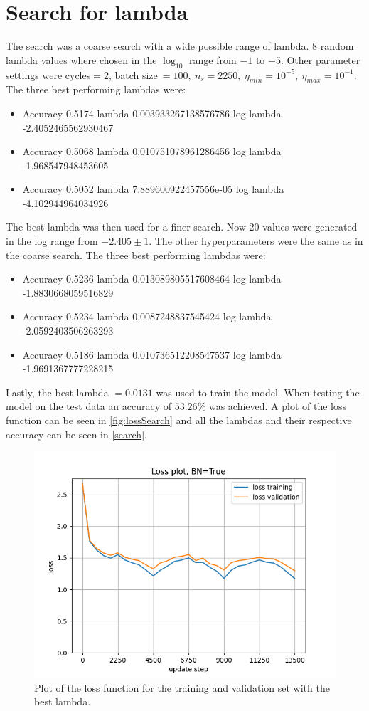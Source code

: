 \documentclass[12pt, a4paper]{article}
\begin{document}
\section{Search for lambda}
The search was a coarse search with a wide possible range of lambda. 8 random lambda values where chosen in the $\log_{10}$ range from $-1$ to $-5$. Other parameter settings were cycles$=2$, batch size$\ =100,\ n_s=2250,\ \eta_{min}=10^{-5},\ \eta_{max}=10^{-1}$. The three best performing lambdas were:
\begin{itemize}
    \item Accuracy 0.5174 lambda 0.003933267138576786 log lambda -2.4052465562930467
    \item Accuracy 0.5068 lambda 0.010751078961286456 log lambda -1.968547948453605
    \item Accuracy 0.5052 lambda 7.889600922457556e-05 log lambda -4.102944964034926
\end{itemize}

The best lambda was then used for a finer search. Now 20 values were generated in the log range from $-2.405\pm 1$. The other hyperparameters were the same as in the coarse search. The three best performing lambdas were:

\begin{itemize}
    \item Accuracy 0.5236 lambda 0.013089805517608464 log lambda -1.8830668059516829
    \item Accuracy 0.5234 lambda 0.0087248837545424 log lambda -2.0592403506263293
    \item Accuracy 0.5186 lambda 0.010736512208547537 log lambda -1.9691367777228215
\end{itemize}

Lastly, the best lambda $=0.0131$ was used to train the model. When testing the model on the test data an accuracy of $53.26\%$ was achieved. A plot of the loss function can be seen in \autoref{fig:lossSearch} and all the lambdas and their respective accuracy can be seen in \autoref{search}.

\begin{figure}[H]
    \includegraphics{results/3-2250-3-loss-True.png}
    \caption{Plot of the loss function for the training and validation set with the best lambda.}
    \label{fig:lossSearch}
\end{figure}
\end{document}
